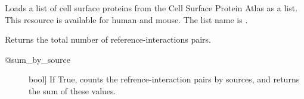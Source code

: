 \documentclass[letterpaper,10pt,english]{sphinxmanual}
\begin{document}
\begin{fulllineitems}
\begin{fulllineitems}
\begin{quote}
\begin{description}
\end{description}\end{quote}

\end{fulllineitems}


\begin{fulllineitems}
\label{\detokenize{main:pypath.main.PyPath.cspa_list}}
Loads a list of cell surface proteins from the Cell Surface Protein
Atlas as a list. This resource is available for human and mouse.
The list name is .

\end{fulllineitems}


\begin{fulllineitems}
\label{\detokenize{main:pypath.main.PyPath.curation_effort}}
Returns the total number of reference-interactions pairs.
\begin{description}
\item[{@sum\_by\_source}] \leavevmode{[}bool{]}
If True, counts the refrence-interaction pairs by
sources, and returns the sum of these values.

\end{description}

\end{fulllineitems}


\begin{fulllineitems}
\label{\detokenize{main:pypath.main.PyPath.curation_stats}}
\end{fulllineitems}


\begin{fulllineitems}
\label{\detokenize{main:pypath.main.PyPath.curation_tab}}
\end{fulllineitems}


\end{fulllineitems}
\end{document}
